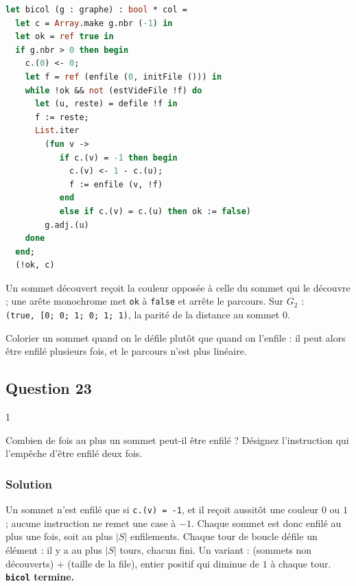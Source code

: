 \documentclass[11pt,a4paper]{article}
\begin{document}
\begin{lstlisting}[language=Caml]
let bicol (g : graphe) : bool * col =
  let c = Array.make g.nbr (-1) in
  let ok = ref true in
  if g.nbr > 0 then begin
    c.(0) <- 0;
    let f = ref (enfile (0, initFile ())) in
    while !ok && not (estVideFile !f) do
      let (u, reste) = defile !f in
      f := reste;
      List.iter
        (fun v ->
           if c.(v) = -1 then begin
             c.(v) <- 1 - c.(u);
             f := enfile (v, !f)
           end
           else if c.(v) = c.(u) then ok := false)
        g.adj.(u)
    done
  end;
  (!ok, c)
\end{lstlisting}

Un sommet découvert reçoit la couleur opposée à celle du sommet qui le découvre ; une arête monochrome met \texttt{ok} à \texttt{false} et arrête le parcours. Sur \(G_2\) : \texttt{(\allowbreak{}true,\allowbreak{}\ {[}\textbar{}0;\allowbreak{}\ 0;\allowbreak{}\ 1;\allowbreak{}\ 0;\allowbreak{}\ 1;\allowbreak{}\ 1\textbar{}{]}\allowbreak{})\allowbreak{}}, la parité de la distance au sommet \(0\).

\begin{piege}

Colorier un sommet quand on le défile plutôt que quand on l'enfile : il peut alors être enfilé plusieurs fois, et le parcours n'est plus linéaire.

\end{piege}

\hypertarget{question-23}{%
\subsection{Question 23}\label{question-23}}

\begin{indication}{1}

Combien de fois au plus un sommet peut-il être enfilé ? Désignez l'instruction qui l'empêche d'être enfilé deux fois.

\end{indication}

\hypertarget{solution-22}{%
\subsubsection{Solution}\label{solution-22}}

Un sommet n'est enfilé que si \texttt{c.(v)\ =\ -1}, et il reçoit aussitôt une couleur \(0\) ou \(1\) ; aucune instruction ne remet une case à \(-1\). Chaque sommet est donc enfilé au plus une fois, soit au plus \(|S|\) enfilements. Chaque tour de boucle défile un élément : il y a au plus \(|S|\) tours, chacun fini. Un variant : (sommets non découverts) + (taille de la file), entier positif qui diminue de \(1\) à chaque tour. \textbf{\texttt{bicol} termine.}
\end{document}
